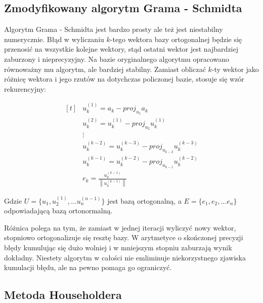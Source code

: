 \documentclass[11pt,wide]{mwart}
\newcommand{\norm}[1]{\left\lVert#1\right\rVert}
\begin{document}
\subsection{Zmodyfikowany algorytm Grama - Schmidta}

Algorytm Grama - Schmidta jest bardzo prosty ale też jest niestabilny numerycznie. Błąd w wyliczaniu $k$-tego wektora bazy ortogonalnej będzie się przenosić na wszystkie kolejne wektory, stąd ostatni wektor jest najbardziej zaburzony i nieprecyzyjny. 
Na bazie oryginalnego algorytmu opracowano równoważny mu algorytm, ale bardziej stabilny.
Zamiast obliczać $k$-ty wektor jako różnicę wektora i jego rzutów na dotychczas policzonej bazie, stosuje się wzór rekurencyjny:

\begin{equation*}
\begin{aligned}[t]
& u_k^{(1)} = a_k - proj_{u_1} a_k \\
& u_k^{(2)} = u_k^{(1)} - proj_{u_2} u_k^{(1)} \\
& \vdots \\
& u_k^{(k-2)} = u_k^{(k-3)} - proj_{u_{k-2}} u_k^{(k-3)} \\
& u_k^{(k-1)} = u_k^{(k-2)} - proj_{u_{k-1}} u_k^{(k-2)} \\
& e_k = \frac{u_k^{(k-1)}}{\norm{u_k^{(k-1)}}}
\end{aligned}
\end{equation*}

Gdzie $U = \{u_1, u_2^{(1)}, \dots u_n^{(n-1)}\}$ jest bazą ortogonalną, a $E = \{e_1, e_2, \dots e_n\}$ odpowiadającą bazą ortonormalną.

Różnica polega na tym, że zamiast w jednej iteracji wyliczyć nowy wektor, stopniowo ortogonalizuje się resztę bazy. W arytmetyce o skończonej precyzji błędy kumulując się dużo wolniej i w mniejszym stopniu zaburzają wynik dokładny. Niestety algorytm w całości nie emliminuje niekorzystnego zjawiska kumulacji błędu, ale na pewno pomaga go ograniczyć.

\subsection{Metoda Householdera}
\end{document}
